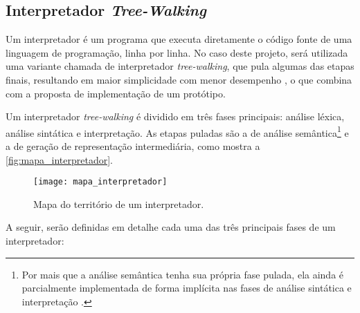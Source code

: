 \subsection{Interpretador \textit{Tree-Walking}}

Um interpretador é um programa que executa diretamente o código fonte de uma linguagem de programação, linha por linha. No caso deste projeto, será utilizada uma variante chamada de interpretador \textit{tree-walking}, que pula algumas das etapas finais, resultando em maior simplicidade com menor desempenho \cite{craftinginterpreters}, o que combina com a proposta de implementação de um protótipo.

Um interpretador \textit{tree-walking} é dividido em três fases principais: análise léxica, análise sintática e interpretação. As etapas puladas são a de análise semântica\footnote{Por mais que a análise semântica tenha sua própria fase pulada, ela ainda é parcialmente implementada de forma implícita nas fases de análise sintática e interpretação \cite{craftinginterpreters}.} e a de geração de representação intermediária, como mostra a \autoref{fig:mapa_interpretador}.

\begin{figure}[H]
	\centering
	\texttt{[image: mapa\_interpretador]}
	\caption{Mapa do território de um interpretador.}
	\label{fig:mapa_interpretador}
\end{figure}

A seguir, serão definidas em detalhe cada uma das três principais fases de um interpretador:

